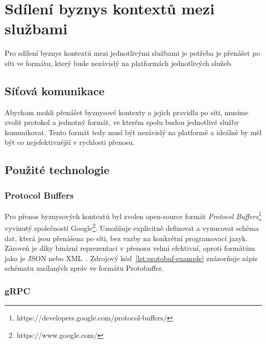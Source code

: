 \section{Sdílení byznys kontextů mezi službami}

Pro sdílení byznys kontextů mezi jednotlivými službami
je potřeba je přenášet po síti ve formátu, který bude
nezávislý na platformách jednotlivých služeb.

\subsection{Síťová komunikace}

Abychom mohli přenášet byznysové kontexty a jejich pravidla
po síti, musíme zvolit protokol a jednotný formát, ve kterém
spolu budou jednotlivé služby komunikovat.
Tento formát tedy musí být nezávislý na platformě a ideálně
by měl být co nejefektivnější v rychlosti přenosu.

\subsection{Použité technologie}

\subsubsection{Protocol Buffers}

Pro přenos byznysových kontextů byl zvolen open-source formát
\textit{Protocol Buffers}\footnote{
https://developers.google.com/protocol-buffers/
}
vyvinutý společností Google\footnote{
https://www.google.com/
}. Umožňuje explicitně definovat a vynucovat schéma dat,
která jsou přenášena po síti, bez vazby na konkrétní programovací
jazyk. Zároveň je díky binární reprezentaci v přenosu velmi efektivní,
oproti formátům jako je JSON nebo XML~\cite{varda2008protocol}.
Zdrojový kód~\ref{lst:protobuf-example} znázorňuje zápis schématu
zasílaných zpráv ve formátu Protobuffer.




\subsubsection{gRPC}

